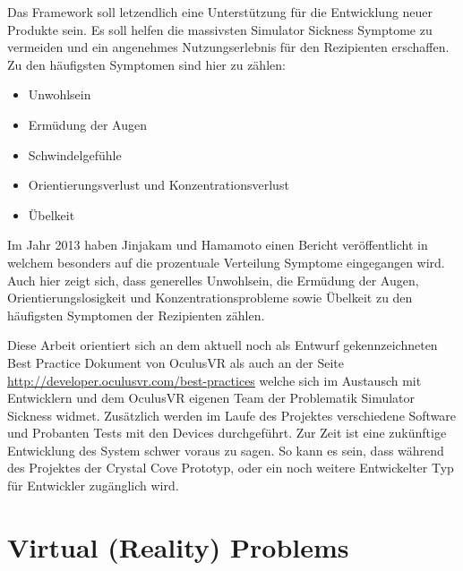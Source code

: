 \documentclass[pagesize, paper=a4, fontsize=12pt,titlepage=true, headings=small, headnosepline, abstractoff, liststotoc, nochapterprefix, plainheadsepline, twoside]{scrreprt}
\begin{document}
Das Framework soll letzendlich eine Unterstützung für die Entwicklung neuer Produkte sein. Es soll helfen die massivsten Simulator Sickness Symptome zu vermeiden und ein angenehmes Nutzungserlebnis für den Rezipienten erschaffen. Zu den häufigsten Symptomen sind hier zu zählen:
\begin{itemize}
\item Unwohlsein
\item Ermüdung der Augen
\item Schwindelgefühle
\item Orientierungsverlust und Konzentrationsverlust
\item Übelkeit
\end{itemize}

Im Jahr 2013 haben Jinjakam und Hamamoto einen Bericht veröffentlicht \cite{JinjakamHamamoto2012} in welchem besonders auf die prozentuale Verteilung Symptome eingegangen wird. Auch hier zeigt sich, dass generelles Unwohlsein, die Ermüdung der Augen, Orientierungslosigkeit und Konzentrationsprobleme sowie Übelkeit zu den häufigsten Symptomen der Rezipienten zählen.

Diese Arbeit orientiert sich an dem aktuell noch als Entwurf gekennzeichneten Best Practice Dokument von OculusVR als auch an der Seite \url{http://developer.oculusvr.com/best-practices} welche sich im Austausch mit Entwicklern und dem OculusVR eigenen Team der Problematik Simulator Sickness widmet. Zusätzlich werden im Laufe des Projektes verschiedene Software und Probanten Tests mit den Devices durchgeführt. Zur Zeit ist eine zukünftige Entwicklung des System schwer voraus zu sagen. So kann es sein, dass während des Projektes der Crystal Cove Prototyp, oder ein noch weitere Entwickelter Typ für Entwickler zugänglich wird.




\chapter{Virtual (Reality) Problems}
\end{document}
